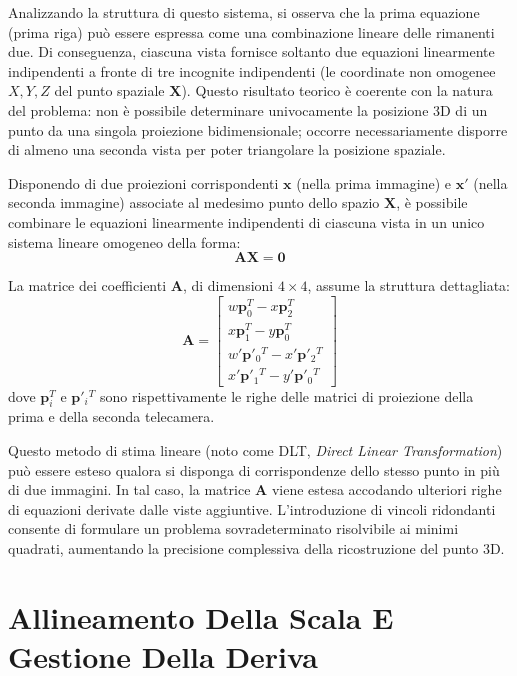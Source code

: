 ﻿\documentclass[11pt, a4paper]{article}
\begin{document}
Analizzando la struttura di questo sistema, si osserva che la prima equazione (prima riga) può essere espressa come una combinazione lineare delle rimanenti due. Di conseguenza, ciascuna vista fornisce soltanto due equazioni linearmente indipendenti a fronte di tre incognite indipendenti (le coordinate non omogenee $X, Y, Z$ del punto spaziale $\bm{X}$). Questo risultato teorico è coerente con la natura del problema: non è possibile determinare univocamente la posizione 3D di un punto da una singola proiezione bidimensionale; occorre necessariamente disporre di almeno una seconda vista per poter triangolare la posizione spaziale.

Disponendo di due proiezioni corrispondenti $\bm{x}$ (nella prima immagine) e $\bm{x}'$ (nella seconda immagine) associate al medesimo punto dello spazio $\bm{X}$, è possibile combinare le equazioni linearmente indipendenti di ciascuna vista in un unico sistema lineare omogeneo della forma:
\[ \bm{A}\bm{X} = \bm{0} \]

La matrice dei coefficienti $\bm{A}$, di dimensioni $4 \times 4$, assume la struttura dettagliata:
\[ \bm{A} = \begin{bmatrix} w \bm{p}_0^T - x \bm{p}_2^T \\ x \bm{p}_1^T - y \bm{p}_0^T \\ w' \bm{p}'_0{}^T - x' \bm{p}'_2{}^T \\ x' \bm{p}'_1{}^T - y' \bm{p}'_0{}^T \end{bmatrix} \]
dove $\bm{p}_i^T$ e $\bm{p}'_i{}^T$ sono rispettivamente le righe delle matrici di proiezione della prima e della seconda telecamera.

Questo metodo di stima lineare (noto come DLT, \emph{Direct Linear Transformation}) può essere esteso qualora si disponga di corrispondenze dello stesso punto in più di due immagini. In tal caso, la matrice $\bm{A}$ viene estesa accodando ulteriori righe di equazioni derivate dalle viste aggiuntive. L'introduzione di vincoli ridondanti consente di formulare un problema sovradeterminato risolvibile ai minimi quadrati, aumentando la precisione complessiva della ricostruzione del punto 3D.

\newpage

\section{Allineamento Della Scala E Gestione Della Deriva}

\end{document}

